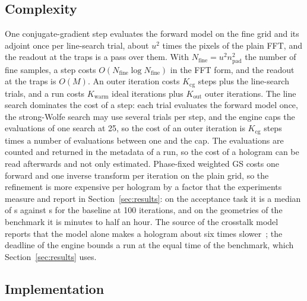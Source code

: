 \subsection{Complexity}\label{sec:complexity}

One conjugate-gradient step evaluates the forward model on the fine grid and its adjoint once per line-search trial, about $u^2$ times the pixels of the plain FFT, and the readout at the traps is a pass over them. With $N_{\mathrm{fine}}=u^2n_{\mathrm{pad}}^2$ the number of fine samples, a step costs
$O(N_{\mathrm{fine}}\log N_{\mathrm{fine}})$ in the FFT form, and the readout at the traps is $O(M)$. An outer iteration costs $K_{\mathrm{cg}}$ steps plus the line-search trials, and a run costs $K_{\mathrm{warm}}$ ideal iterations plus $K_{\mathrm{out}}$ outer iterations. The line search dominates the cost of a step: each trial evaluates the forward model once, the strong-Wolfe search may use several trials per step, and the engine caps the evaluations of one search at 25, so the cost of an outer iteration is $K_{\mathrm{cg}}$ steps times a number of evaluations between one and the cap. The evaluations are counted and returned in the metadata of a run, so the cost of a hologram can be read afterwards and not only estimated. Phase-fixed weighted GS costs one forward and one inverse transform per iteration on the plain grid, so the refinement is more expensive per hologram by a factor that the experiments measure and report in Section~\ref{sec:results}: on the acceptance task it is a median of \secBXMedian{} s against \secMXSevenHundred{} s for the baseline at 100 iterations, and on the geometries of the benchmark it is minutes to half an hour. The source of the crosstalk model reports that the model alone makes a hologram about six times slower~\cite{schroff}; the deadline of the engine bounds a run at the equal time of the benchmark, which Section~\ref{sec:results} uses.

\subsection{Implementation}\label{sec:implementation}


